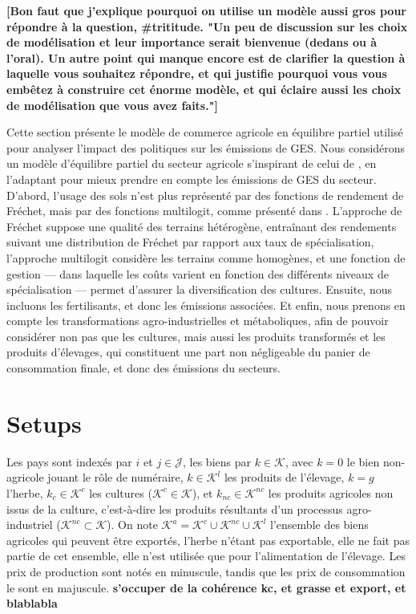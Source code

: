 \textbf{[Bon faut que j'explique pourquoi on utilise un modèle aussi gros pour répondre à la question, \#trititude. "Un peu de discussion sur les choix de modélisation et leur importance serait bienvenue (dedans ou à l'oral). Un autre point qui manque encore est de clarifier la question à laquelle vous souhaitez répondre, et qui justifie pourquoi vous vous embêtez à construire cet énorme modèle, et qui éclaire aussi les choix de modélisation que vous avez faits."]}

Cette section présente le modèle de commerce agricole en équilibre partiel utilisé pour analyser l’impact des politiques sur les émissions de GES. Nous considérons un modèle d'équilibre partiel du secteur agricole s'inspirant de celui de \cite{Gouel2021}, en l'adaptant pour mieux prendre en compte les émissions de GES du secteur. D'abord, l'usage des sols n'est plus représenté par des fonctions de rendement de Fréchet, mais par des fonctions multilogit, comme présenté dans \cite{Gouel202x}. L’approche de Fréchet suppose une qualité des terrains hétérogène, entraînant des rendements suivant une distribution de Fréchet par rapport aux taux de spécialisation, l’approche multilogit considère les terrains comme homogènes, et une fonction de gestion — dans laquelle les coûts varient en fonction des différents niveaux de spécialisation — permet d'assurer la diversification des cultures. Ensuite, nous incluons les fertilisants, et donc les émissions associées. Et enfin, nous prenons en compte les transformations agro-industrielles et métaboliques, afin de pouvoir considérer non pas que les cultures, mais aussi les produits transformés et les produits d'élevages, qui constituent une part non négligeable du panier de consommation finale, et donc des émissions du secteurs.


\section{Setups}

Les pays sont indexés par $i$ et $j \in \mathcal{J}$, les biens par $k \in \mathcal{K}$, avec $k=0$ le bien non-agricole jouant le rôle de numéraire, $k \in \mathcal{K}^l$ les produits de l’élevage, $k = g$ l’herbe, $k_c \in \mathcal{K}^c$ les cultures ($\mathcal{K}^c \in \mathcal{K}$), et $k_{nc} \in \mathcal{K}^{nc}$ les produits agricoles non issus de la culture, c’est-à-dire les produits résultants d’un processus agro-industriel ($\mathcal{K}^{nc} \subset \mathcal{K}$). On note $\mathcal{K}^a = \mathcal{K}^c \cup \mathcal{K}^{nc} \cup \mathcal{K}^l$ l’ensemble des biens agricoles qui peuvent être exportés, l’herbe n’étant pas exportable, elle ne fait pas partie de cet ensemble, elle n’est utilisée que pour l’alimentation de l’élevage. Les prix de production sont notés en minuscule, tandis que les prix de consommation le sont en majuscule. \textbf{s'occuper de la cohérence kc, et grasse et export, et blablabla}

